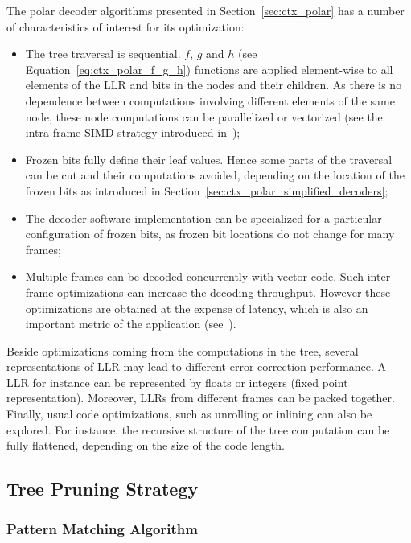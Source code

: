 The polar decoder algorithms presented in Section~\ref{sec:ctx_polar} has a
number of characteristics of interest for its optimization:
\begin{itemize}
  \item The tree traversal is sequential. $f$, $g$ and $h$ (see
    Equation~\ref{eq:ctx_polar_f_g_h}) functions are applied element-wise to all
    elements of the LLR and bits in the nodes and their children. As there is no
    dependence between computations involving different elements of the same
    node, these node computations can be parallelized or vectorized (see the
    intra-frame SIMD strategy introduced in~\cite{Giard2014});
  \item Frozen bits fully define their leaf values. Hence some parts of the
    traversal can be cut and their computations avoided, depending on the
    location of the frozen bits as introduced in
    Section~\ref{sec:ctx_polar_simplified_decoders};
  \item The decoder software implementation can be specialized for a particular
    configuration of frozen bits, as frozen bit locations do not change for many
    frames;
  \item Multiple frames can be decoded concurrently with vector code. Such
    inter-frame optimizations can increase the decoding throughput. However
    these optimizations are obtained at the expense of latency, which is also an
    important metric of the application (see~\cite{LeGal2015a}).
\end{itemize}

Beside optimizations coming from the computations in the tree, several
representations of LLR may lead to different error correction performance. A LLR
for instance can be represented by floats or integers (fixed point
representation). Moreover, LLRs from different frames can be packed together.
Finally, usual code optimizations, such as unrolling or inlining can also be
explored. For instance, the recursive structure of the tree computation can be
fully flattened, depending on the size of the code length.

\subsection{Tree Pruning Strategy}
\label{sec:opt_polar_tree_pruning}

\subsubsection{Pattern Matching Algorithm}
\label{sec:opt_polar_pattern_matching}

